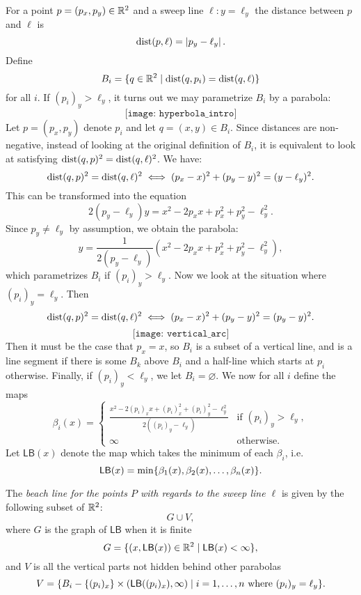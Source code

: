 For a point $p = (p_x, p_y) \in \mathbb{R}^2$ and a sweep line $\ell \colon y = \ell_y$ the distance between $p$ and $\ell$ is
\[
    \operatorname{dist}(p, \ell) = \left\lvert p_y - \ell_y \right\rvert.
\]
Define
\[
    B_i = \{q \in \mathbb{R}^2 \mid \operatorname{dist}(q, p_i) = \operatorname{dist}(q, \ell)\}
\]
for all $i$. If $(p_i)_y > \ell_y$, it turns out we may parametrize $B_i$ by a parabola:
\[
    \texttt{[image: hyperbola\_intro]}
\]
Let $p = (p_x, p_y)$ denote $p_i$ and let $q = (x, y) \in B_i$. Since distances are non-negative, instead of looking at the original definition of $B_i$, it is equivalent to look at satisfying $\operatorname{dist}(q, p)^2 = \operatorname{dist}(q, \ell)^2$. We have:
\[
    \operatorname{dist}(q, p)^2 = \operatorname{dist}(q, \ell)^2 \iff (p_x - x)^2 + (p_y - y)^2 = (y - \ell_y)^2.
\]
This can be transformed into the equation
\begin{equation}
    2 (p_y - \ell_y) y = x^2 - 2 p_x x + p_x^2 + p_y^2 - \ell_y^2.
\end{equation}
Since $p_y \ne \ell_y$ by assumption, we obtain the parabola:
\begin{equation} \label{eq:parabola}
    y = \frac{1}{2 (p_y - \ell_y)} (x^2 - 2 p_x x + p_x^2 + p_y^2 - \ell_y^2),
\end{equation}
which parametrizes $B_i$ if $(p_i)_y > \ell_y$. Now we look at the situation where $(p_i)_y = \ell_y$. Then
\[
    \operatorname{dist}(q, p)^2 = \operatorname{dist}(q, \ell)^2 \iff (p_x - x)^2 + (p_y - y)^2 = (p_y - y)^2.
\]
\[
    \texttt{[image: vertical\_arc]}
\]
Then it must be the case that $p_x = x$, so $B_i$ is a subset of a vertical line, and is a line segment if there is some $B_k$ above $B_i$ and a half-line which starts at $p_i$ otherwise. Finally, if $(p_i)_y < \ell_y$, we let $B_i = \varnothing$. We now for all $i$ define the maps
\[
    \beta_i(x) = \begin{cases}
        \displaystyle \frac{x^2 - 2 (p_i)_x x + (p_i)_x^2 + (p_i)_y^2 - \ell_y^2}{2 ((p_i)_y - \ell_y)} & \text{if } (p_i)_y > \ell_y, \\
        \infty & \text{otherwise.}
    \end{cases}
\]
Let $\textsf{LB}(x)$ denote the map which takes the minimum of each $\beta_i$, i.e.
\[
    \textsf{LB}(x) = \min\{\beta_1(x), \beta_2(x), \ldots, \beta_n(x)\}.
\]
\begin{defn}
The \emph{beach line for the points $P$ with regards to the sweep line $\ell$} is given by the following subset of $\mathbb{R}^2$:
\[
    G \cup V,
\]
where $G$ is the graph of $\textsf{LB}$ when it is finite
\[
    G = \{(x, \textsf{LB}(x)) \in \mathbb{R}^2 \mid \textsf{LB}(x) < \infty\},
\]
and $V$ is all the vertical parts not hidden behind other parabolas
\[
    V = \{B_i - \{(p_i)_x\} \times (\textsf{LB}((p_i)_x), \infty) \mid i = 1, \ldots, n \text{ where } (p_i)_y = \ell_y\}.
\]
\end{defn}
